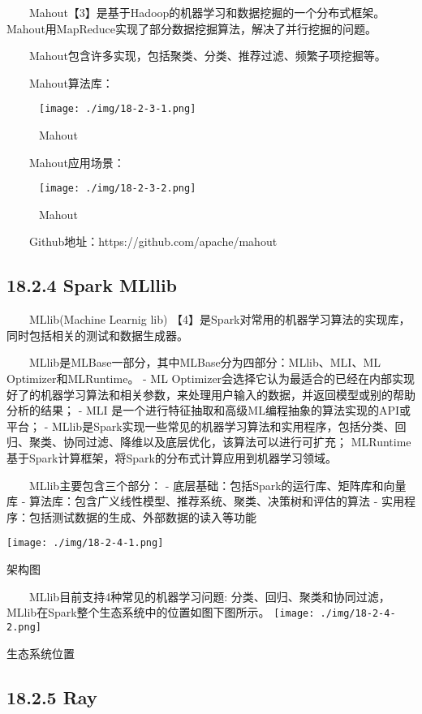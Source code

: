   Mahout【3】是基于Hadoop的机器学习和数据挖掘的一个分布式框架。Mahout用MapReduce实现了部分数据挖掘算法，解决了并行挖掘的问题。

  Mahout包含许多实现，包括聚类、分类、推荐过滤、频繁子项挖掘等。

  Mahout算法库：

\begin{figure}
\centering
\texttt{[image: ./img/18-2-3-1.png]}
\caption{Mahout}
\end{figure}

  Mahout应用场景：

\begin{figure}
\centering
\texttt{[image: ./img/18-2-3-2.png]}
\caption{Mahout}
\end{figure}

  Github地址：https://github.com/apache/mahout

\subsection{18.2.4 Spark MLllib}\label{spark-mlllib}

  MLlib(Machine Learnig lib)
【4】是Spark对常用的机器学习算法的实现库，同时包括相关的测试和数据生成器。

  MLlib是MLBase一部分，其中MLBase分为四部分：MLlib、MLI、ML
Optimizer和MLRuntime。 - ML
Optimizer会选择它认为最适合的已经在内部实现好了的机器学习算法和相关参数，来处理用户输入的数据，并返回模型或别的帮助分析的结果；
- MLI 是一个进行特征抽取和高级ML编程抽象的算法实现的API或平台； -
MLlib是Spark实现一些常见的机器学习算法和实用程序，包括分类、回归、聚类、协同过滤、降维以及底层优化，该算法可以进行可扩充；
MLRuntime 基于Spark计算框架，将Spark的分布式计算应用到机器学习领域。

  MLlib主要包含三个部分： - 底层基础：包括Spark的运行库、矩阵库和向量库
- 算法库：包含广义线性模型、推荐系统、聚类、决策树和评估的算法 -
实用程序：包括测试数据的生成、外部数据的读入等功能

\texttt{[image: ./img/18-2-4-1.png]}

架构图

  MLlib目前支持4种常见的机器学习问题:
分类、回归、聚类和协同过滤，MLlib在Spark整个生态系统中的位置如图下图所示。
\texttt{[image: ./img/18-2-4-2.png]}

生态系统位置

\subsection{18.2.5 Ray}\label{ray}

